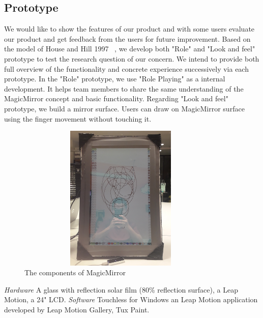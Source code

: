 \documentclass{sigchi-ext}
\begin{document}
\subsection{Prototype}
We would like to show the features of our product and with some users evaluate our product and get feedback from the users for future improvement.
Based on the model of House and Hill 1997 ~\cite{houdeChapter16What1997}, we develop both "Role" and "Look and feel" prototype to test the research question of our concern. We intend to provide both full overview of the functionality and concrete experience successively via each prototype.
In the "Role" prototype, we use "Role Playing" as a internal development. It helps team members to share the same understanding of the MagicMirror concept and basic functionality. Regarding "Look and feel" prototype, we build a mirror surface. Users can draw on MagicMirror surface using the finger movement without touching it.
\begin{figure}[h]
\caption{The components of MagicMirror}
\centering
\includegraphics[width=10cm, height=7cm, angle=-90]{prototype}
\end{figure}
\linebreak
\textit{Hardware}
A glass with reflection solar film (80\% reflection surface), a Leap Motion, a 24" LCD.
\textit{Software}
Touchless for Windows an Leap Motion application developed by Leap Motion Gallery, Tux Paint.
\end{document}
